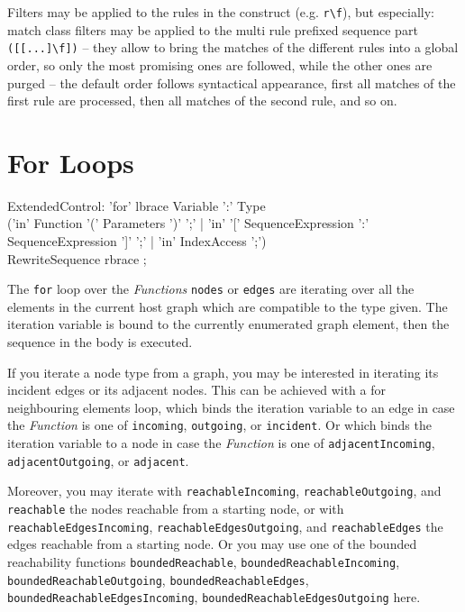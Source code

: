Filters may be applied to the rules in the construct (e.g. \verb#r\f#), but especially: match class filters may be applied to the multi rule prefixed sequence part \verb#([[...]\f])# -- they allow to bring the matches of the different rules into a global order, so only the most promising ones are followed, while the other ones are purged -- the default order follows syntactical appearance, first all matches of the first rule are processed, then all matches of the second rule, and so on.

\section{For Loops}

\begin{rail}
  ExtendedControl:
    'for' lbrace Variable ':' Type\\
    ('in' Function '(' Parameters ')' ';' |
		'in' '[' SequenceExpression ':' SequenceExpression ']' ';' |
		'in' IndexAccess ';')\\
    RewriteSequence rbrace
    ;
\end{rail}\label{forgraphelem}\label{forincidentadjacent}

The \texttt{for} loop over the \emph{Functions} \texttt{nodes} or \texttt{edges} are iterating over all the elements in the current host graph which are compatible to the type given.
The iteration variable is bound to the currently enumerated graph element, then the sequence in the body is executed.

If you iterate a node type from a graph, you may be interested in iterating its incident edges or its adjacent nodes.
This can be achieved with a for neighbouring elements loop, which binds the iteration variable to an edge in case the \emph{Function} is one of \texttt{incoming}, \texttt{outgoing}, or \texttt{incident}. 
Or which binds the iteration variable to a node in case the \emph{Function} is one of \texttt{adjacentIncoming}, \texttt{adjacentOutgoing}, or \texttt{adjacent}.

Moreover, you may iterate with \texttt{reachable\-Incoming}, \texttt{reachable\-Outgoing}, and \texttt{reachable} the nodes reachable from a starting node, or with \texttt{reachable\-Edges\-Incoming}, \texttt{reachable\-Edges\-Outgoing}, and \texttt{reachable\-Edges} the edges reachable from a starting node.
Or you may use one of the bounded reachability functions \texttt{bounded\-Reachable}, \texttt{bounded\-Reachable\-Incoming}, \texttt{bounded\-Reachable\-Outgoing}, \texttt{bounded\-Reachable\-Edges}, \texttt{bounded\-Reachable\-Edges\-Incoming}, \texttt{bounded\-Reachable\-Edges\-Outgoing} here.

